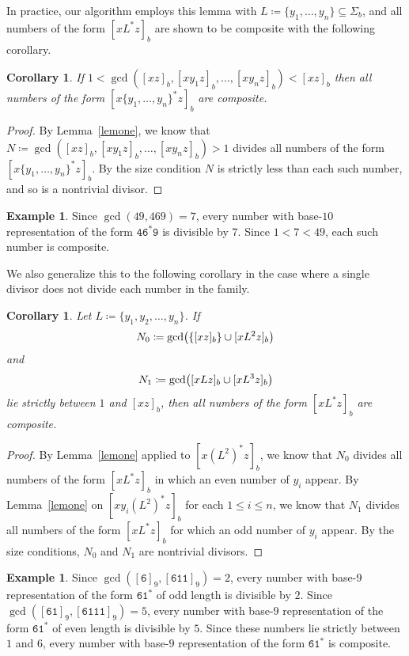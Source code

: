 \documentclass[12pt]{article}
\DeclarePairedDelimiter\paren{\lparen}{\rparen}
\theoremstyle{plain}
\newtheorem{corollary}[theorem]{Corollary}
\theoremstyle{definition}
\newtheorem{example}[theorem]{Example}
\theoremstyle{remark}
\newcommand{\0}{\mathtt{0}}
\newcommand{\1}{\mathtt{1}}
\newcommand{\2}{\mathtt{2}}
\newcommand{\3}{\mathtt{3}}
\newcommand{\4}{\mathtt{4}}
\newcommand{\5}{\mathtt{5}}
\newcommand{\6}{\mathtt{6}}
\newcommand{\7}{\mathtt{7}}
\newcommand{\8}{\mathtt{8}}
\newcommand{\9}{\mathtt{9}}
\newcommand{\union}{\cup}
\begin{document}
In practice, our algorithm employs this lemma with 
$L\coloneqq\{y_1,\dotsc,y_n\}\subseteq\Sigma_b$, and all numbers of the form
$[xL^*z]_b$ are shown to be composite with the following corollary.
\begin{corollary}\label{corone}
If $1<\gcd([xz]_b,[xy_1z]_b,\dotsc,[xy_nz]_b)<[xz]_b$
 then all numbers of the form $[x\{y_1,\dotsc,y_n\}^*z]_b$ are composite.
\end{corollary}
\begin{proof}
By Lemma~\ref{lemone}, we know
that $N\coloneqq\gcd([xz]_b,[xy_1z]_b,\dotsc,[xy_nz]_b)>1$ 
divides all numbers of the form $[x\{y_1,\dotsc,y_n\}^*z]_b$.
By the size condition $N$ is strictly less than each such number, and
so is a nontrivial divisor.
\end{proof}

\begin{example}
Since $\gcd(49, 469)=7$, every number with base-$10$ representation
of the form $\4\6^*\9$ is 
divisible by $7$.
Since $1 < 7 < 49$, each such number is composite.
\end{example}

We also generalize this to the following corollary in the case where 
a single divisor does not divide each number in the family.
\begin{corollary}\label{cortwo}
Let $L \coloneqq \lbrace y_1, y_2, \ldots, y_n \rbrace$.
If \[N_0\coloneqq\gcd \paren[\big]{ \{ [xz]_b \} \union [xL^2 z]_b} \]
and
\[ N_1\coloneqq \gcd \paren[\big]{[xLz]_b \union [xL^3z]_b} \]
lie strictly between $1$ and $[xz]_b$, then all numbers of the form 
$[xL^*z]_b$ are composite.
\end{corollary}
\begin{proof}
By Lemma~\ref{lemone} applied
to $[x(L^2)^*z]_b$, we know that $N_0$ divides all numbers of the 
form $[x L^* z]_b$ in which an even number of $y_i$ appear.
By Lemma~\ref{lemone} on $[xy_i(L^2)^*z]_b$ 
for each $1\leq i\leq n$, we know that $N_1$ 
divides all numbers of the form $[x L^* z]_b$ for which an 
odd number of $y_i$ appear.
By the size conditions, $N_0$ and $N_1$ are nontrivial divisors.
\end{proof}

\begin{example}
Since $\gcd([\6]_9,[\6\1\1]_9)=2$, every number with
base-$9$ representation of the form $\6\1^*$ of 
odd length is divisible by $2$.
Since $\gcd([\6\1]_9,[\6\1\1\1]_9)=5$,
every number with base-$9$ representation of the form $\6\1^*$ 
of even length is divisible by $5$.  Since these numbers lie 
strictly between $1$ and $6$, every number with base-$9$
representation of the form $\6\1^*$ is 
composite.
\end{example}
\end{document}
